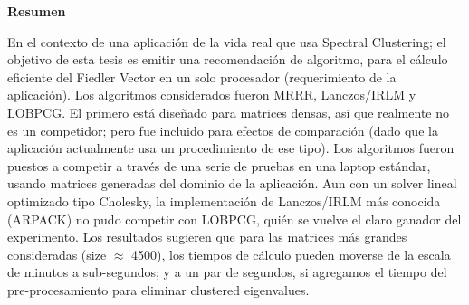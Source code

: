 \thispagestyle{plain}
\begin{center}

  \vspace{0.4cm}


  \vspace{0.9cm}
  \textbf{Resumen}
\end{center}

    En el contexto de una aplicación de la vida real que usa Spectral
    Clustering; el objetivo de esta tesis es emitir una recomendación
    de algoritmo, para el cálculo eficiente del Fiedler Vector en un
    solo procesador (requerimiento de la aplicación). Los algoritmos
    considerados fueron MRRR, Lanczos/IRLM y LOBPCG. El primero está
    diseñado para matrices densas, así que realmente no es un competidor;
    pero fue incluido para efectos de comparación (dado que la aplicación
    actualmente usa un procedimiento de ese tipo). Los algoritmos fueron
    puestos a competir a través de una serie de pruebas en una
    laptop estándar, usando matrices generadas del dominio de la aplicación. 
    Aun con un solver lineal optimizado tipo Cholesky, la implementación
    de Lanczos/IRLM más conocida (ARPACK) no pudo competir con LOBPCG,
    quién se vuelve el claro  
    ganador del experimento. Los resultados sugieren que para las matrices más
    grandes consideradas (size $\approx$ 4500), los tiempos de cálculo
    pueden moverse  
    de la escala de minutos a sub-segundos; y a un par de segundos, si
    agregamos el tiempo del pre-procesamiento para eliminar 
    clustered eigenvalues.  
